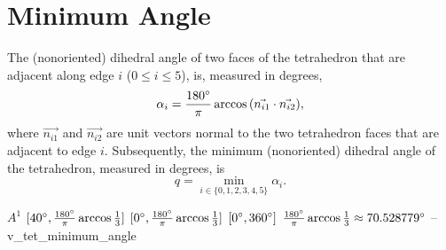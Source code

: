 \section{Minimum Angle\label{s:tet-min-angle}}

The (nonoriented) dihedral angle of two faces of the
tetrahedron that are adjacent along edge $i$ ($0\le{}i\le5$), is,
measured in degrees,
\[
  \alpha_i = \frac{180^{\circ}}{\pi}
    \arccos{\left(\vec{n_{i1}} \cdot \vec{n_{i2}}\right)},
\]
where $\vec{n_{i1}}$ and $\vec{n_{i2}}$ are unit vectors normal to the
two tetrahedron faces that are adjacent to edge $i$. Subsequently,
the minimum (nonoriented) dihedral angle of the tetrahedron, measured
in degrees, is
\[
  q =
    \min_{i\in\{0,1,2,3,4,5\}}{\alpha_i}.
\]

%
{$A^1$}%
{$[40^{\circ},\frac{180^{\circ}}{\pi}\arccos\tfrac{1}{3}]$}%
{$[0^{\circ},\frac{180^{\circ}}{\pi}\arccos\tfrac{1}{3}]$}%
{$[0^{\circ},360^{\circ}]$}%
{$\frac{180^{\circ}}{\pi}\arccos\tfrac{1}{3}\approx70.528779^{\circ}$}%
{--}%
{v\_tet\_minimum\_angle}%

